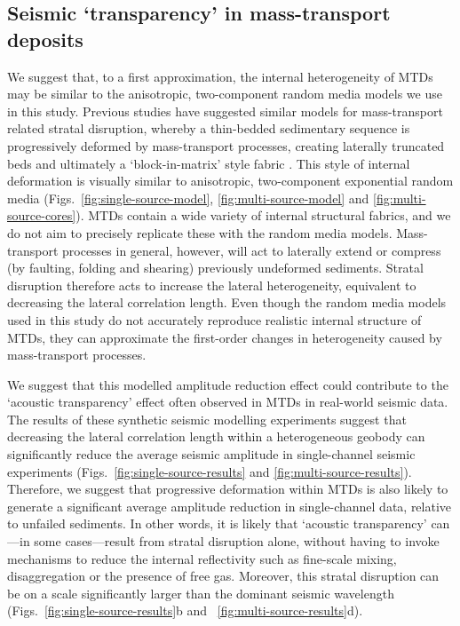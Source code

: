 \documentclass[se,manuscript]{copernicus}
\begin{document}
\subsection{Seismic `transparency' in mass-transport deposits}
We suggest that, to a first approximation, the internal heterogeneity of MTDs may be similar to the anisotropic, two-component random media models we use in this study.
Previous studies have suggested similar models for mass-transport related stratal disruption, whereby a thin-bedded sedimentary sequence is progressively deformed by mass-transport processes, creating laterally truncated beds and ultimately a `block-in-matrix' style fabric \citep[][see Fig.~\ref{fig:multi-source-cores}b, this study]{ogata_mass_2012, ford2020}.
This style of internal deformation is visually similar to anisotropic, two-component exponential random media (Figs.~\ref{fig:single-source-model}, \ref{fig:multi-source-model} and \ref{fig:multi-source-cores}).
MTDs contain a wide variety of internal structural fabrics, and we do not aim to precisely replicate these with the random media models.
Mass-transport processes in general, however, will act to laterally extend or compress (by faulting, folding and shearing) previously undeformed sediments.
Stratal disruption therefore acts to increase the lateral heterogeneity, equivalent to decreasing the lateral correlation length.
Even though the random media models used in this study do not accurately reproduce realistic internal structure of MTDs, they can approximate the first-order changes in heterogeneity caused by mass-transport processes.

We suggest that this modelled amplitude reduction effect could contribute to the `acoustic transparency' effect often observed in MTDs in real-world seismic data.
The results of these synthetic seismic modelling experiments suggest that decreasing the lateral correlation length within a heterogeneous geobody can significantly reduce the average seismic amplitude in single-channel seismic experiments (Figs.~\ref{fig:single-source-results} and \ref{fig:multi-source-results}).
Therefore, we suggest that progressive deformation within MTDs is also likely to generate a significant average amplitude reduction in single-channel data, relative to unfailed sediments.
In other words, it is likely that `acoustic transparency' can---in some cases---result from stratal disruption alone, without having to invoke mechanisms to reduce the internal reflectivity such as fine-scale mixing, disaggregation or the presence of free gas.
Moreover, this stratal disruption can be on a scale significantly larger than the dominant seismic wavelength (Figs.~\ref{fig:single-source-results}b and ~\ref{fig:multi-source-results}d).
\end{document}
